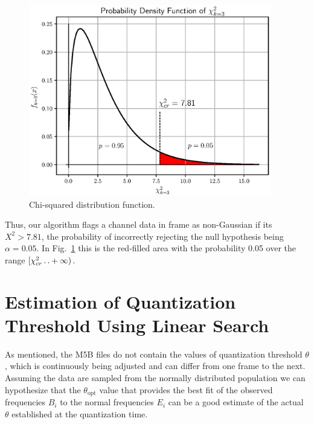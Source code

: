 \documentclass[letterpaper,twoside,12pt]{article}
\newcommand{\twodots}{\mathinner {\ldotp \ldotp}}
\begin{document}
\begin{figure}[ht!]
  \begin{center}
  \includegraphics[width=25pc]{fig_chi2_pdf.eps}
  \caption{\small Chi-squared distribution function.}
  \label{chi2_pdf}
  \end{center}
\end{figure}

Thus, our algorithm flags a channel data in frame as non-Gaussian if its $X^2 > 7.81$, the probability of incorrectly rejecting the null hypothesis being $\alpha = 0.05$. In Fig.~\ref{chi2_pdf} this is the red-filled area with the probability 0.05 over the range $[\chi^2_{cr} \twodots +\infty)$. 



\section{Estimation of Quantization Threshold Using Linear Search}

As mentioned, the M5B files do not contain the values of quantization threshold $\theta$, which is continuously being adjusted and can differ from one frame to the next. Assuming the data are sampled from the normally distributed population we can hypothesize that the $\theta_{\text{opt}}$ value that provides the best fit of the observed frequencies $B_i$ to the normal frequencies $E_i$ can be a good estimate of the actual $\theta$ established at the quantization time.
\end{document}
